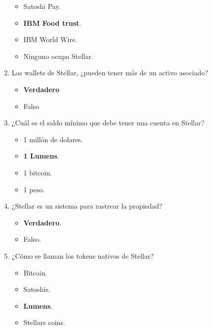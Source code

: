 \documentclass[a4paper,12pt]{/home/armando/Documentos/Cursos/LaTeX/Plantillas/lib/pub}
\begin{document}
\begin{enumerate}
	\begin{itemize}
		\item Satoshi Pay.
		\item \textbf{IBM Food trust}.
		\item IBM World Wire.
		\item Ninguno ocupa Stellar.
	\end{itemize}
	\item Las wallets de Stellar, ¿pueden tener más de un activo asociado?
	\begin{itemize}
		\item \textbf{Verdadero}
		\item Falso
	\end{itemize}
	\item ¿Cuál es el saldo mínimo que debe tener una cuenta en Stellar?
	\begin{itemize}
		\item 1 millón de dolares.
		\item \textbf{1 Lumens}.
		\item 1 bitcoin.
		\item 1 peso.
	\end{itemize}
	\item  ¿Stellar es un sistema para rastrear la propiedad?
	\begin{itemize}
		\item \textbf{Verdadero}.
		\item Falso.
	\end{itemize}
	\item ¿Cómo se llaman los tokens nativos de Stellar?
	\begin{itemize}
		\item Bitcoin.
		\item Satoshis.
		\item \textbf{Lumens}.
		\item Stellars coins.
	\end{itemize}
\end{enumerate}
\end{document}
